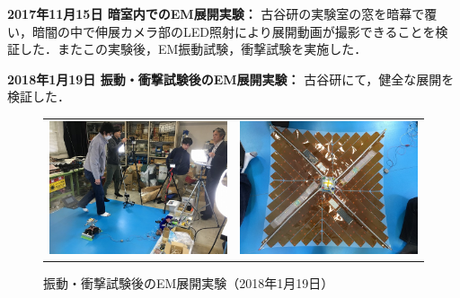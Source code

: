 \noindent \textbf{2017年11月15日 暗室内でのEM展開実験：} 古谷研の実験室の窓を暗幕で覆い，暗闇の中で伸展カメラ部のLED照射により展開動画が撮影できることを検証した．またこの実験後，EM振動試験，衝撃試験を実施した．\vspace{2mm}

\noindent \textbf{2018年1月19日 振動・衝撃試験後のEM展開実験：} 古谷研にて，健全な展開を検証した．
\begin{figure}[H]
	\centering
	\begin{tabular}{cc}
		\begin{minipage}{0.5\hsize}
			\begin{center}
				\includegraphics[width=1\textwidth]{03/fig/3-9-3-1-14.jpg}
			\end{center}
		\end{minipage}&
		\begin{minipage}{0.5\hsize}
			\begin{center}
				\includegraphics[width=1\textwidth]{03/fig/3-9-3-1-15.jpg}
			\end{center}
		\end{minipage}
	\end{tabular}
\caption{振動・衝撃試験後のEM展開実験（2018年1月19日）}
\label{fig3-9-3-1-14}
\end{figure}

